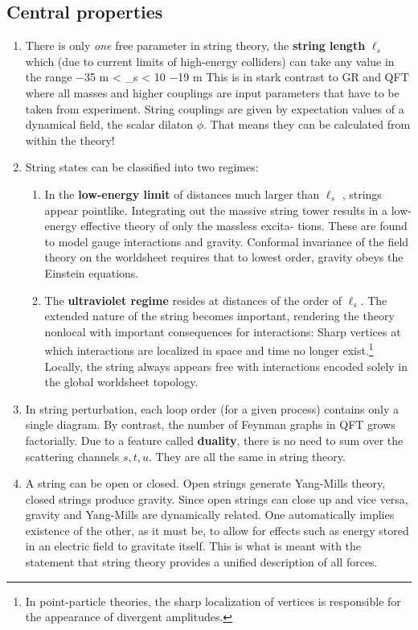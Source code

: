 \subsection{Central properties}
\label{subsec:stringProperties}
\begin{enumerate}
	\item There is only \emph{one} free parameter in string theory, the \textbf{string length} $\ell_s$ which (due to current limits
	of high-energy colliders) can take any value in the range
	\bse 
	 −35 m < \ell_s < 10 −19 m
	\quad {}
	\ese 
	This is in stark contrast to GR and QFT where all masses and higher couplings are input parameters
	that have to be taken from experiment. String couplings are given by expectation values of a
	dynamical field, the scalar dilaton $\phi$. That means they can be calculated from within the theory!
	\item String states can be classified into two regimes:
	\begin{enumerate}
	\item  In the \textbf{low-energy limit} of distances much larger than $\ell_s$ , strings appear pointlike. Integrating
	out the massive string tower results in a low-energy effective theory of only the massless excita-
	tions. These are found to model gauge interactions and gravity. Conformal invariance of the field
	theory on the worldsheet requires that to lowest order, gravity obeys the Einstein equations.
	\item  The \textbf{ultraviolet regime} resides at distances of the order of $\ell_s$. The extended nature of the string
	becomes important, rendering the theory nonlocal with important consequences for interactions:
	Sharp vertices at which interactions are localized in space and time no longer exist.\footnote{In point-particle theories, the sharp localization of vertices is responsible for the appearance of divergent amplitudes.} Locally, the
	string always appears free with interactions encoded solely in the global worldsheet topology.
\end{enumerate}
	\item In string perturbation, each loop order (for a given process) contains only a single diagram. By
	contrast, the number of Feynman graphs in QFT grows factorially. Due to a feature called \textbf{duality},
	there is no need to sum over the scattering channels $s, t, u$. They are all the same in string theory.
	\item A string can be open or closed. Open strings generate Yang-Mills theory, closed strings produce
	gravity. Since open strings can close up and vice versa, gravity and Yang-Mills are dynamically
	related. One automatically implies existence of the other, as it must be, to allow for effects such as
	energy stored in an electric field to gravitate itself. This is what is meant with the statement that
	string theory provides a unified description of all forces.
\end{enumerate}


